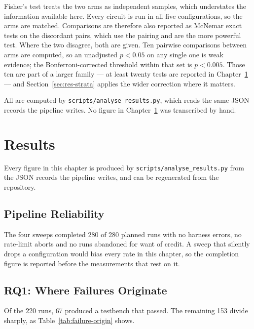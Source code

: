 \documentclass[11pt,a4paper,titlepage=false]{scrreprt}
\begin{document}
Fisher's test treats the two arms as independent samples, which understates the information
available here. Every circuit is run in all five configurations, so the arms are matched.
Comparisons are therefore also reported as McNemar exact tests on the discordant pairs, which
use the pairing and are the more powerful test. Where the two disagree, both are given.
Ten pairwise comparisons between arms are computed, so an unadjusted $p<0.05$ on any single
one is weak evidence; the Bonferroni-corrected threshold within that set is $p<0.005$. Those
ten are part of a larger family --- at least twenty tests are reported in
Chapter~\ref{ch:results} --- and Section~\ref{sec:res-strata} applies the wider correction
where it matters.

All are computed by \texttt{scripts/analyse\_results.py}, which reads the same JSON records
the pipeline writes. No figure in Chapter~\ref{ch:results} was transcribed by hand.

\chapter{Results}\label{ch:results}

Every figure in this chapter is produced by \texttt{scripts/analyse\_results.py} from the
JSON records the pipeline writes, and can be regenerated from the repository.

\section{Pipeline Reliability}\label{sec:res-reliability}

The four sweeps completed 280 of 280 planned runs with no harness errors, no rate-limit
aborts and no runs abandoned for want of credit. A sweep that silently drops a configuration
would bias every rate in this chapter, so the completion figure is reported before the
measurements that rest on it.

\section{RQ1: Where Failures Originate}\label{sec:res-rq1}

Of the 220 runs, 67 produced a testbench that passed. The remaining 153 divide sharply, as
Table~\ref{tab:failure-origin} shows.
\end{document}

